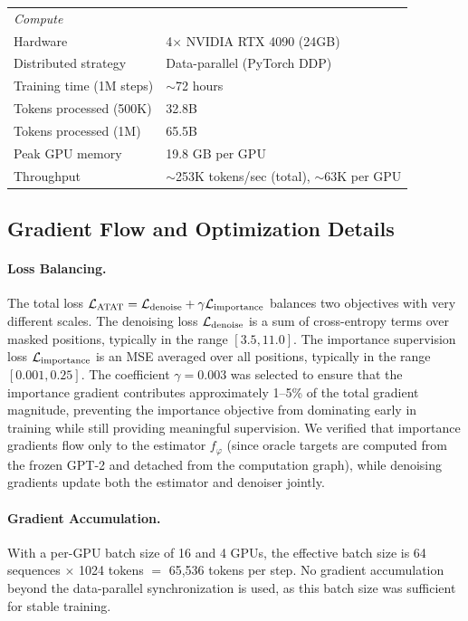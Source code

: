 \begin{table}[H]
\begin{tabular}{ll}
\midrule
\multicolumn{2}{l}{\textit{Compute}} \\
Hardware & 4$\times$ NVIDIA RTX 4090 (24GB) \\
Distributed strategy & Data-parallel (PyTorch DDP) \\
Training time (1M steps) & $\sim$72 hours \\
Tokens processed (500K) & 32.8B \\
Tokens processed (1M) & 65.5B \\
Peak GPU memory & 19.8 GB per GPU \\
Throughput & $\sim$253K tokens/sec (total), $\sim$63K per GPU \\
\bottomrule
\end{tabular}
\end{table}

\subsection{Gradient Flow and Optimization Details}

\paragraph{Loss Balancing.} The total loss $\mathcal{L}_{\text{ATAT}} = \mathcal{L}_{\text{denoise}} + \gamma \mathcal{L}_{\text{importance}}$ balances two objectives with very different scales. The denoising loss $\mathcal{L}_{\text{denoise}}$ is a sum of cross-entropy terms over masked positions, typically in the range $[3.5, 11.0]$. The importance supervision loss $\mathcal{L}_{\text{importance}}$ is an MSE averaged over all positions, typically in the range $[0.001, 0.25]$. The coefficient $\gamma = 0.003$ was selected to ensure that the importance gradient contributes approximately 1--5\% of the total gradient magnitude, preventing the importance objective from dominating early in training while still providing meaningful supervision. We verified that importance gradients flow only to the estimator $f_\varphi$ (since oracle targets are computed from the frozen GPT-2 and detached from the computation graph), while denoising gradients update both the estimator and denoiser jointly.

\paragraph{Gradient Accumulation.} With a per-GPU batch size of 16 and 4 GPUs, the effective batch size is 64 sequences $\times$ 1024 tokens $=$ 65,536 tokens per step. No gradient accumulation beyond the data-parallel synchronization is used, as this batch size was sufficient for stable training.

